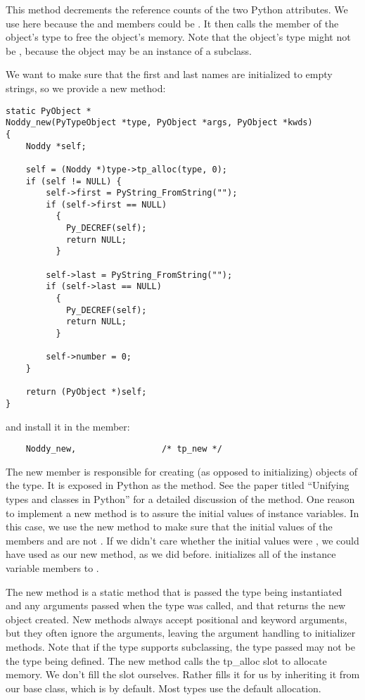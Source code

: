 This method decrements the reference counts of the two Python
attributes. We use  here because the
 and  members could be \NULL.  It then
calls the  member of the object's type to free the
object's memory.  Note that the object's type might not be
, because the object may be an instance of a
subclass.

We want to make sure that the first and last names are initialized to
empty strings, so we provide a new method:

\begin{verbatim}
static PyObject *
Noddy_new(PyTypeObject *type, PyObject *args, PyObject *kwds)
{
    Noddy *self;

    self = (Noddy *)type->tp_alloc(type, 0);
    if (self != NULL) {
        self->first = PyString_FromString("");
        if (self->first == NULL)
          {
            Py_DECREF(self);
            return NULL;
          }

        self->last = PyString_FromString("");
        if (self->last == NULL)
          {
            Py_DECREF(self);
            return NULL;
          }

        self->number = 0;
    }

    return (PyObject *)self;
}
\end{verbatim}

and install it in the  member:

\begin{verbatim}
    Noddy_new,                 /* tp_new */
\end{verbatim}

The new member is responsible for creating (as opposed to
initializing) objects of the type.  It is exposed in Python as the
 method.  See the paper titled ``Unifying types and
classes in Python'' for a detailed discussion of the 
method.  One reason to implement a new method is to assure the initial
values of instance variables.  In this case, we use the new method to
make sure that the initial values of the members  and
 are not \NULL. If we didn't care whether the initial
values were \NULL, we could have used  as
our new method, as we did before.  
initializes all of the instance variable members to \NULL.

The new method is a static method that is passed the type being
instantiated and any arguments passed when the type was called,
and that returns the new object created. New methods always accept
positional and keyword arguments, but they often ignore the arguments,
leaving the argument handling to initializer methods. Note that if the
type supports subclassing, the type passed may not be the type being
defined.  The new method calls the tp_alloc slot to allocate memory.
We don't fill the  slot ourselves. Rather
 fills it for us by inheriting it from our
base class, which is  by default.  Most types use the
default allocation.

